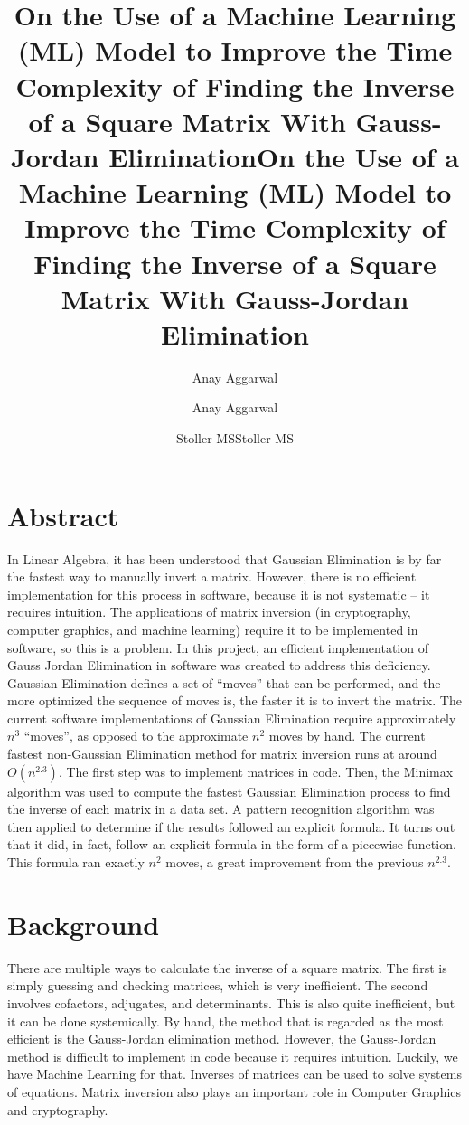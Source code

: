 \documentclass{article}
\title{On the Use of a Machine Learning (ML) Model to Improve the Time Complexity of Finding the Inverse of a Square Matrix With Gauss-Jordan Elimination}
\author{Anay Aggarwal}
\date{Stoller MS}
\title{{\large On the Use of a Machine Learning (ML) Model to Improve the Time Complexity of Finding the Inverse of a Square Matrix With Gauss-Jordan Elimination}}
\author{Anay Aggarwal}
\date{Stoller MS}
\begin{document}
\maketitle
\thispagestyle{firstpage}
\newpage
\thispagestyle{fancy}
\section*{Abstract}
In Linear Algebra, it has been understood that Gaussian Elimination is by far the fastest way to manually invert a matrix. However, there is no efficient implementation for this process in software, because it is not systematic -- it requires intuition. The applications of matrix inversion (in cryptography, computer graphics, and machine learning) require it to be implemented in software, so this is a problem. In this project, an efficient implementation of Gauss Jordan Elimination in software was created to address this deficiency. Gaussian Elimination defines a set of “moves” that can be performed, and the more optimized the sequence of moves is, the faster it is to invert the matrix. The current software implementations of Gaussian Elimination require approximately $n^3$ “moves”, as opposed to the approximate $n^2$ moves by hand. The current fastest non-Gaussian Elimination method for matrix inversion runs at around $O(n^{2.3})$. The first step was to implement matrices in code. Then, the Minimax algorithm was used to compute the fastest Gaussian Elimination process to find the inverse of each matrix in a data set. A pattern recognition algorithm was then applied to determine if the results followed an explicit formula. It turns out that it did, in fact, follow an explicit formula in the form of a piecewise function. This formula ran exactly $n^2$ moves, a great improvement from the previous $n^{2.3}$.
\newpage
\section*{Background}
There are multiple ways to calculate the inverse of a square matrix. The first is simply guessing and checking matrices, which is very inefficient. The second involves cofactors, adjugates, and determinants. This is also quite inefficient, but it can be done systemically. By hand, the method that is regarded as the most efficient is the Gauss-Jordan elimination method. However, the Gauss-Jordan method is difficult to implement in code because it requires intuition. Luckily, we have Machine Learning for that. Inverses of matrices can be used to solve systems of equations.  Matrix inversion also plays an important role in Computer Graphics and cryptography.
\end{document}
